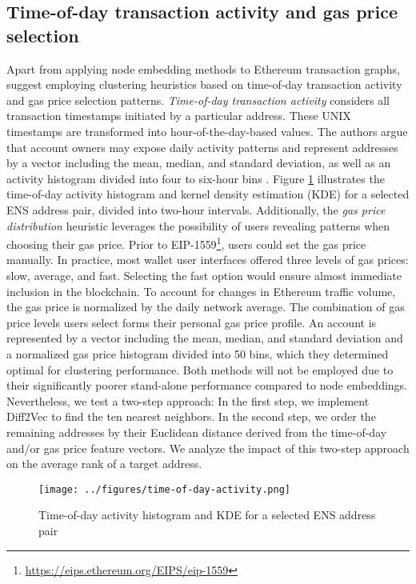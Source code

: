 \documentclass[12pt,a4paper,titlepage,oneside,english]{article}
\begin{document}
\subsection{Time-of-day transaction activity and gas price selection}
Apart from applying node embedding methods to Ethereum transaction graphs, \cite{Beres2020} suggest employing clustering heuristics based on time-of-day transaction activity and gas price selection patterns. \newline
\textit{Time-of-day transaction activity} considers all transaction timestamps initiated by a particular address. These UNIX timestamps are transformed into hour-of-the-day-based values. The authors argue that account owners may expose daily activity patterns and represent addresses by a vector including the mean, median, and standard deviation, as well as an activity histogram divided into four to six-hour bins \citep{Beres2020}.  Figure \ref{fig:ToD} illustrates the time-of-day activity histogram and kernel density estimation (KDE) for a selected ENS address pair, divided into two-hour intervals.\newline
Additionally, the \textit{gas price distribution} heuristic leverages the possibility of users revealing patterns when choosing their gas price. Prior to EIP-1559\footnote{\url{https://eips.ethereum.org/EIPS/eip-1559}}, users could set the gas price manually. In practice, most wallet user interfaces offered three levels of gas prices: slow, average, and fast. Selecting the fast option would ensure almost immediate inclusion in the blockchain. To account for changes in Ethereum traffic volume, the gas price is normalized by the daily network average. The combination of gas price levels users select forms their personal gas price profile. An account is represented by a vector including the mean, median, and standard deviation and a normalized gas price histogram divided into 50 bins, which they determined optimal for clustering performance. \citep{Beres2020} \newline
Both methods will not be employed due to their significantly poorer stand-alone performance compared to node embeddings. Nevertheless, we test a two-step approach: In the first step, we implement Diff2Vec to find the ten nearest neighbors. In the second step, we order the remaining addresses by their Euclidean distance derived from the time-of-day and/or gas price feature vectors. We analyze the impact of this two-step approach on the average rank of a target address.

\begin{figure}[h!]
	\centering
	\texttt{[image: ../figures/time-of-day-activity.png]}
	\caption{Time-of-day activity histogram and KDE for a selected ENS address pair}
	\label{fig:ToD}
\end{figure} 
\end{document}
